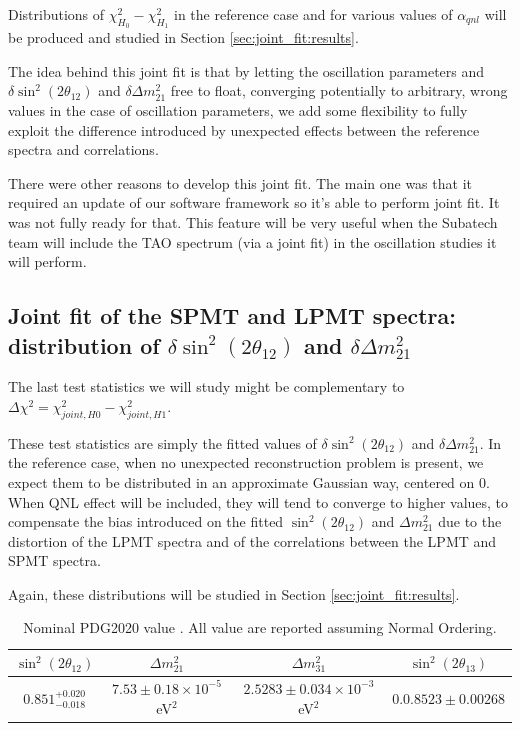 \documentclass[../main.tex]{subfiles}
\begin{document}
Distributions of $\chi^2_{H_0}-\chi^2_{H_1}$ in the reference case and for various values of $\alpha_{qnl}$ will be produced and studied in Section \ref{sec:joint_fit:results}.

The idea behind this joint fit is that by letting the oscillation parameters and $\delta \sin^2(2\theta_{12})$ and $\delta \Delta m^2_{21}$ free to float, converging potentially to arbitrary, wrong values in the case of oscillation parameters, we add some flexibility to fully exploit the difference introduced by unexpected effects between the reference spectra and correlations.

There were other reasons to develop this joint fit. The main one was that it required an update of our software framework so it's able to perform joint fit. It was not fully ready for that. This feature will be very useful when the Subatech team will include the TAO spectrum (via a joint fit) in the oscillation studies it will perform.

\subsection{Joint fit of the SPMT and LPMT spectra: distribution of $\delta \sin^2(2\theta_{12})$ and $\delta \Delta m^2_{21}$}
\label{sec:joint_fit:delta_distrib}

The last test statistics we will study might be complementary to $ \Delta \chi^2 = \chi^2_{joint,H0} - \chi^2_{joint, H1} $.

These test statistics are simply the fitted values of $\delta \sin^2(2\theta_{12})$ and $\delta \Delta m^2_{21}$. In the reference case, when no unexpected reconstruction problem
is present, we expect them to be distributed in an approximate Gaussian way, centered on 0. When QNL effect will be included, they will tend to converge to higher values, to compensate the bias introduced on the fitted $\sin^2(2\theta_{12})$ and $\Delta m^2_{21}$ due to the distortion of the LPMT spectra and of the correlations between the LPMT and SPMT spectra.

Again, these distributions will be studied in Section \ref{sec:joint_fit:results}.

\begin{table}
  \centering
  \begin{tabular}{c|c|c|c}
    $\sin^2(2\theta_{12})$    & $\Delta m^2_{21}$                       & $\Delta m^2_{31}$      & $\sin^2(2\theta_{13})$ \\
    \hline
    $0.851^{+0.020}_{-0.018}$ & $7.53 \pm 0.18 \times 10^{-5}$ eV$^2$   & $2.5283 \pm 0.034 \times 10^{-3}$ eV$^2$  & $0.0.8523 \pm 0.00268$
  \end{tabular}
  \caption{Nominal PDG2020 value \cite{particle_data_group_review_2020}. All value are reported assuming Normal Ordering.}
  \label{tab:joint_fit:pdg_value}
\end{table}
\end{document}
